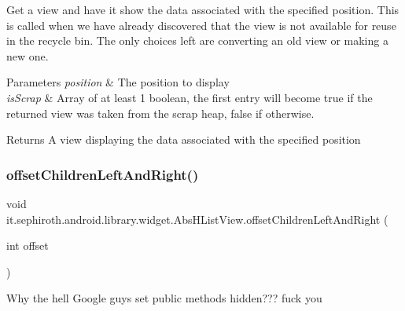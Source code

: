 Get a view and have it show the data associated with the specified position. This is called when we have already discovered that the view is not available for reuse in the recycle bin. The only choices left are converting an old view or making a new one.


\begin{DoxyParams}{Parameters}
{\em position} & The position to display \\
\hline
{\em is\+Scrap} & Array of at least 1 boolean, the first entry will become true if the returned view was taken from the scrap heap, false if otherwise.\\
\hline
\end{DoxyParams}
\begin{DoxyReturn}{Returns}
A view displaying the data associated with the specified position 
\end{DoxyReturn}
\mbox{\label{classit_1_1sephiroth_1_1android_1_1library_1_1widget_1_1_abs_h_list_view_a6469278a8ed1a2ca62c20cf05613a88f}} 
\subsubsection{\texorpdfstring{offset\+Children\+Left\+And\+Right()}{offsetChildrenLeftAndRight()}}
{\footnotesize\ttfamily void it.\+sephiroth.\+android.\+library.\+widget.\+Abs\+H\+List\+View.\+offset\+Children\+Left\+And\+Right (\begin{DoxyParamCaption}\item[{int}]{offset }\end{DoxyParamCaption})}

Why the hell Google guys set public methods hidden??? fuck you \mbox{\label{classit_1_1sephiroth_1_1android_1_1library_1_1widget_1_1_abs_h_list_view_a7b9240f45a4f371750bf2377edef8037}} 
